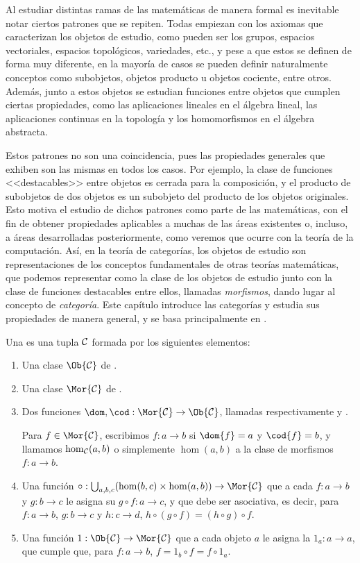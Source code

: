 Al estudiar distintas ramas de las matemáticas de manera formal es inevitable
notar ciertos patrones que se repiten. Todas empiezan con los axiomas que
caracterizan los objetos de estudio, como pueden ser los grupos, espacios
vectoriales, espacios topológicos, variedades, etc., y pese a que estos se
definen de forma muy diferente, en la mayoría de casos se pueden definir
naturalmente conceptos como subobjetos, objetos producto u objetos cociente,
entre otros. Además, junto a estos objetos se estudian funciones entre objetos
que cumplen ciertas propiedades, como las aplicaciones lineales en el álgebra
lineal, las aplicaciones continuas en la topología y los homomorfismos en el
álgebra abstracta.

Estos patrones no son una coincidencia, pues las propiedades generales que
exhiben son las mismas en todos los casos. Por ejemplo, la clase de funciones
<<destacables>> entre objetos es cerrada para la composición, y el producto de
subobjetos de dos objetos es un subobjeto del producto de los objetos
originales. Esto motiva el estudio de dichos patrones como parte de las
matemáticas, con el fin de obtener propiedades aplicables a muchas de las áreas
existentes o, incluso, a áreas desarrolladas posteriormente, como veremos que
ocurre con la teoría de la computación. Así, en la teoría de categorías, los
objetos de estudio son representaciones de los conceptos fundamentales de otras
teorías matemáticas, que podemos representar como la clase de los objetos de
estudio junto con la clase de funciones destacables entre ellos, llamadas
\emph{morfismos}, dando lugar al concepto de \emph{categoría}.  Este capítulo
introduce las categorías y estudia sus propiedades de manera general, y se basa
principalmente en \cite[caps. 3, 4, 7 y 10]{joyofcats}.

\begin{definition}
  \label{def:category}
  Una  es una tupla $\mathcal{C}$ formada por los siguientes elementos:
  \begin{enumerate}
  \item Una clase $\Ob{\cC}$ de .
  \item Una clase $\Mor{\cC}$ de .
  \item Dos funciones $\dom,\cod:\Mor{\cC}\to\Ob{\cC}$, llamadas
    respectivamente  y .

    Para $f\in\Mor{\cC}$, escribimos $f:a\to b$ si $\dom{f}=a$ y $\cod{f}=b$, y
    llamamos $\hom_{\mathcal{C}}(a, b)$ o simplemente $\hom(a, b)$ a la clase de
    morfismos $f:a\to b$. %
  \item Una función
    $\circ:\bigcup_{a,b,c}(\hom(b,c)\times\hom(a,b))\to\Mor{\cC}$ que a cada
    $f:a\to b$ y $g:b\to c$ le asigna su  $g\circ f:a\to c$, y
    que debe ser asociativa, es decir, para $f:a\to b$, $g:b\to c$ y $h:c\to d$,
    $h\circ(g\circ f) = (h\circ g)\circ f$.
  \item Una función $1:\Ob{\cC}\to\Mor{\cC}$ que a cada objeto $a$ le asigna la
     $1_a:a\to a$, que cumple que, para $f:a\to b$,
    $f=1_b\circ f=f\circ 1_a$.
  \end{enumerate}
\end{definition}

